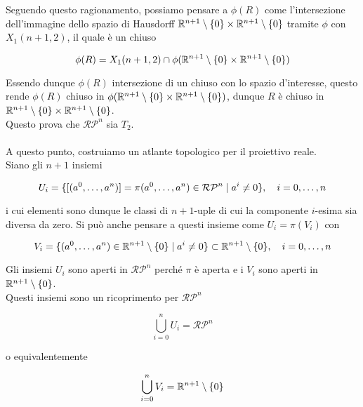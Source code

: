 Seguendo questo ragionamento, possiamo pensare a $ \phi(R) $ come l'intersezione dell'immagine dello spazio di Hausdorff $ \mathbb{R}^{n+1} \setminus \{0\} \times \mathbb{R}^{n+1} \setminus \{0\} $ tramite $ \phi $ con $ X_{1}(n+1,2) $, il quale è un chiuso

\begin{equation}
	\phi(R) = X_{1}(n+1,2) \cap \phi(\mathbb{R}^{n+1} \setminus \{0\} \times \mathbb{R}^{n+1} \setminus \{0\})
\end{equation}

Essendo dunque $ \phi(R) $ intersezione di un chiuso con lo spazio d'interesse, questo rende $ \phi(R) $ chiuso in $ \phi(\mathbb{R}^{n+1} \setminus \{0\} \times \mathbb{R}^{n+1} \setminus \{0\}) $, dunque $ R $ è chiuso in $ \mathbb{R}^{n+1} \setminus \{0\} \times \mathbb{R}^{n+1} \setminus \{0\} $.\\
Questo prova che $ \mathcal{RP}^{n} $ sia $ T_{2} $.\\\\
%
A questo punto, costruiamo un atlante topologico per il proiettivo reale.\\
Siano gli $ n+1 $ insiemi

\begin{equation}
	U_{i} = \{ [(a^{0},\dots,a^{n})] = \pi(a^{0},\dots,a^{n}) \in \mathcal{RP}^{n} \mid a^{i} \neq 0 \} \qcomma i=0,\dots,n
\end{equation}

i cui elementi sono dunque le classi di $ n+1 $-uple di cui la componente $ i $-esima sia diversa da zero. Si può anche pensare a questi insieme come $ U_{i} = \pi(V_{i}) $ con

\begin{equation}
	V_{i} = \{ (a^{0},\dots,a^{n}) \in \R^{n+1} \setminus \{0\} \mid a^{i} \neq 0 \} \subset \R^{n+1} \setminus \{0\} \qcomma i=0,\dots,n
\end{equation}

Gli insiemi $ U_{i} $ sono aperti in $ \mathcal{RP}^{n} $ perché $ \pi $ è aperta e i $ V_{i} $ sono aperti in $ \mathbb{R}^{n+1} \setminus \{0\} $.\\
Questi insiemi sono un ricoprimento per $ \mathcal{RP}^{n} $

\begin{equation}
	\bigcup_{i=0}^{n} U_{i} = \mathcal{RP}^{n}
\end{equation}

o equivalentemente

\begin{equation}
	\bigcup_{i=0}^{n} V_{i} = \mathbb{R}^{n+1} \setminus \{0\}
\end{equation}


